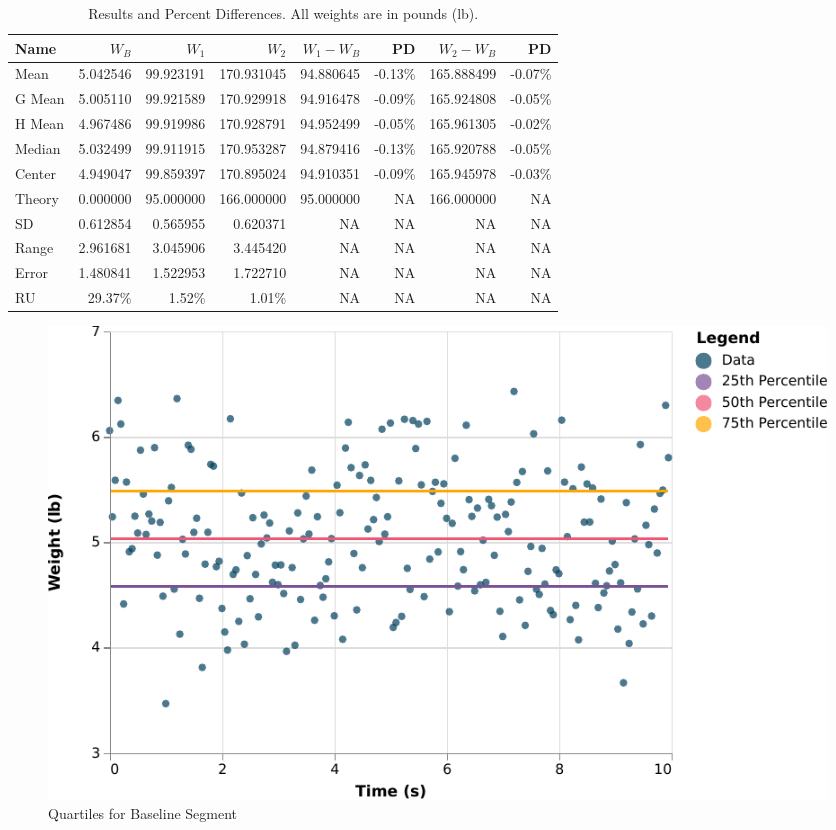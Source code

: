 \begin{table}
    \centering
    \begin{tabular}{|l|r|r|r|r|r|r|r|}
        \hline
        \textbf{Name} & $W_{B}$ & $W_{1}$ & $W_{2}$ & $W_{1} - W_{B}$ & PD & $W_{2} - W_{B}$ & PD \\
        \hline
        Mean & 5.042546 & 99.923191 & 170.931045 & 94.880645 & -0.13\% & 165.888499 & -0.07\% \\
        G Mean & 5.005110 & 99.921589 & 170.929918 & 94.916478 & -0.09\% & 165.924808 & -0.05\% \\
        H Mean & 4.967486 & 99.919986 & 170.928791 & 94.952499 & -0.05\% & 165.961305 & -0.02\% \\
        Median & 5.032499 & 99.911915 & 170.953287 & 94.879416 & -0.13\% & 165.920788 & -0.05\% \\
        Center & 4.949047 & 99.859397 & 170.895024 & 94.910351 & -0.09\% & 165.945978 & -0.03\% \\
        \hline
        Theory & 0.000000 & 95.000000 & 166.000000 & 95.000000 & NA & 166.000000 & NA \\
        \hline
        SD & 0.612854 & 0.565955 & 0.620371 & NA & NA & NA & NA \\
        Range & 2.961681 & 3.045906 & 3.445420 & NA & NA & NA & NA \\
        Error & 1.480841 & 1.522953 & 1.722710 & NA & NA & NA & NA \\
        RU & 29.37\% & 1.52\% & 1.01\% & NA & NA & NA & NA \\
        \hline
    \end{tabular}
    \caption{Results and Percent Differences. All weights are in pounds (lb).}
    \label{table.00.results}
\end{table}
\begin{figure}
    \centering
    \includegraphics{chart/00-intro/baseline-quartiles.pdf}
    \caption{Quartiles for Baseline Segment}
    \label{figure.00.baseline.quartiles}
\end{figure}
